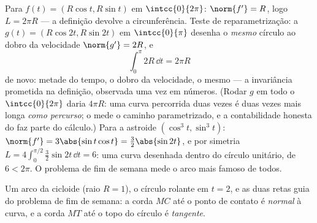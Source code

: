 \begin{example}\label{ex:b1:curves:circlelength}
Para $f(t) = (R\cos t, R\sin t)$ em $\intcc{0}{2\pi}$: $\norm{f'} =
R$, logo $L = 2\pi R$ --- a definição devolve a
circunferência. Teste de reparametrização: a  $g(t) = (R\cos 2t, R\sin 2t)$ em $\intcc{0}{\pi}$
desenha o \emph{mesmo} círculo ao dobro da velocidade $\norm{g'} = 2R$, e
\[
\int_0^{\pi} 2R\,\dd t = 2\pi R
\]
de novo: metade do tempo, o dobro da velocidade, o mesmo 
--- a invariância prometida na definição, observada uma vez em
números. (Rodar $g$ em todo o $\intcc{0}{2\pi}$ daria $4\pi R$: uma curva
percorrida duas vezes é duas vezes mais longa \emph{como percurso};
o  mede o caminho parametrizado, e a contabilidade honesta
do  faz parte do cálculo.) Para a astroide $(\cos^3t, \sin^3t)$: $\norm{f'} = 3\abs{\sin
t\cos t} = \tfrac32\abs{\sin 2t}$, e
por simetria $L = 4\int_0^{\pi/2}
\tfrac32\sin 2t\,\dd t = 6$: uma curva desenhada dentro do círculo unitário,
de  $6 < 2\pi$. O problema de fim de semana mede o arco mais
famoso de todos.
\end{example}

\begin{omfigure}

{\small Um arco da cicloide (raio $R = 1$), o círculo rolante em
$t = 2$, e as duas retas guia do problema de fim de semana: a corda
$MC$ até o ponto de contato é \emph{normal} à curva, e a corda $MT$
até o topo do círculo é \emph{tangente}.}
\end{omfigure}

